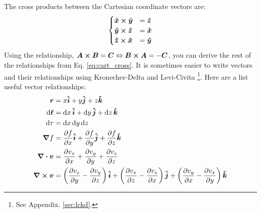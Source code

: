 \documentclass[oneside]{book}
\numberwithin{figure}{section}
\numberwithin{equation}{section}
\newcommand{\paren}[1]{\left(#1\right)}
\newcommand{\bhat}[1]{\bm{\hat{#1}}}
\theoremstyle{definition}
\begin{document}
	The cross products between the Cartesian coordinate vectors are:
	\begin{equation}\label{eq:cart_cross}
		\begin{cases}
			\bhat{x} \cross \bhat{y} &= \bhat{z}\\
			\bhat{y} \cross \bhat{z} &= \bhat{x}\\
			\bhat{z} \cross \bhat{x} &= \bhat{y}
		\end{cases}
	\end{equation}
	Using the relationship, $ \bm{A} \cross \bm{B} = \bm{C} \Leftrightarrow \bm{B} \cross \bm{A} = -\bm{C} $, you can derive the rest of the relationships from Eq. \ref{eq:cart_cross}. It is sometimes easier to write vectors and their relationships using Kronecher-Delta and Levi-Civita \footnote{See Appendix. \ref{sec:lckd}.}. Here are a list useful vector relationships:
	\begin{align}
		\bm{r} &= x\bhat{i} + y\bhat{j} + z\bhat{k}\\
		\dd{\bm{\ell}} &= \dd{x}\bhat{i} + \dd{y}\bhat{j} + \dd{z}\bhat{k}\\
		\dd{\tau} &= \dd{x}\dd{y}\dd{z}\\
		\grad{f} &= \pdv{f}{x}\bhat{i} + \pdv{f}{y}\bhat{j} + \pdv{f}{z}\bhat{k}\\
		\div{\bm{v}} &= \pdv{v_x}{x} + \pdv{v_y}{y} + \pdv{v_z}{z}\\
		\curl{\bm{v}} &= \paren{\pdv{v_z}{y} - \pdv{v_y}{z}}\bhat{i} + \paren{\pdv{v_x}{z} - \pdv{v_z}{x}}\bhat{j} + \paren{\pdv{v_y}{x} - \pdv{v_x}{y}}\bhat{k}
	\end{align}
\end{document}
